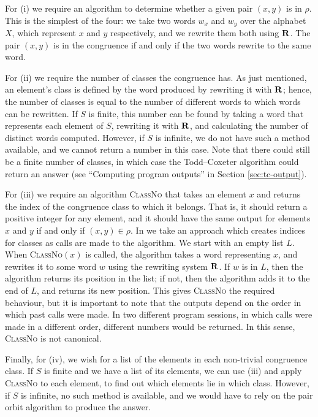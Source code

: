 For (i) we require an algorithm to determine whether a given pair $(x,y)$ is in
$\rho$.  This is the simplest of the four: we take two words $w_x$ and $w_y$
over the alphabet $X$, which represent $x$ and $y$ respectively, and we rewrite
them both using $\mathbf{R}$.  The pair $(x,y)$ is in the congruence if and only if
the two words rewrite to the same word.

For (ii) we require the number of classes the congruence has.  As just
mentioned, an element's class is defined by the word produced by rewriting it
with $\mathbf{R}$; hence, the number of classes is equal to the number of different
words to which words can be rewritten.  If $S$ is finite, this number can be
found by taking a word that represents each element of $S$, rewriting it with
$\mathbf{R}$, and calculating the number of distinct words computed.  However, if $S$
is infinite, we do not have such a method available, and we cannot return a
number in this case.  Note that there could still be a finite number of classes,
in which case the Todd--Coxeter algorithm could return an answer (see
``Computing program outputs'' in Section \ref{sec:tc-output}).

For (iii) we require an algorithm \textsc{ClassNo} that takes an element $x$ and
returns the index of the congruence class to which it belongs.  That is, it
should return a positive integer for any element, and it should have the same
output for elements $x$ and $y$ if and only if $(x,y) \in \rho$.  In
\libsemigroups{} we take an approach which creates indices for classes as calls
are made to the algorithm.  We start with an empty list $L$.  When
\textsc{ClassNo}$(x)$ is called, the algorithm takes a word representing $x$,
and rewrites it to some word $w$ using the rewriting system $\mathbf{R}$.  If $w$ is
in $L$, then the algorithm returns its position in the list; if not, then the
algorithm adds it to the end of $L$, and returns its new position.  This gives
\textsc{ClassNo} the required behaviour, but it is important to note that the
outputs depend on the order in which past calls were made.  In two different
program sessions, in which calls were made in a different order, different
numbers would be returned.  In this sense, \textsc{ClassNo} is not canonical.

Finally, for (iv), we wish for a list of the elements in each non-trivial
congruence class.  If $S$ is finite and we have a list of its elements, we can
use (iii) and apply \textsc{ClassNo} to each element, to find out which elements
lie in which class.  However, if $S$ is infinite, no such method is available,
and we would have to rely on the pair orbit algorithm to produce the answer.

